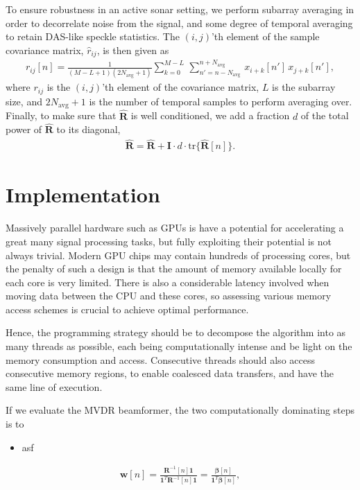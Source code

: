\documentclass[10pt,a4paper]{article}
\newcommand\tr{\text{tr}}
\newcommand\sumb[2]{\sum\limits_{#1}^{#2}\,}
\newcommand\T{^{\scriptscriptstyle T}}
\renewcommand\vec[1]{\boldsymbol{#1}}
\newcommand\mat[1]{\boldsymbol{#1}}
\newcommand\1{\vec 1}
\newcommand\I{\mat I}
\newcommand*\R{\mat R}
\newcommand*\Ri{\R^{-1}}
\newcommand*\eR{\mat{\hat R}}
\begin{document}
To ensure robustness in an active sonar setting, we perform subarray averaging in order to decorrelate noise from the signal, and some degree of temporal averaging to retain \gls{DAS}-like speckle statistics. The $(i,j)$'th element of the sample covariance matrix, $\hat r_{ij}$, is then given as
\begin{gather}
r_{ij}[n] = \frac{1}{(M-L+1)(2N_{\text{avg}}+1)}\sumb{k=0}{M-L} \sumb{n'=n-N_{\text{avg}}}{n+N_{\text{avg}}} x_{i+k}[n']\,x_{j+k}[n'],
\end{gather}
where $r_{ij}$ is the $(i,j)$'th element of the covariance matrix, $L$ is the subarray size, and $2N_{\text{avg}}+1$ is the number of temporal samples to perform averaging over. Finally, to make sure that $\eR$ is well conditioned, we add a fraction $d$ of the total power of $\eR$ to its diagonal\cite{Synnevag2007},
\begin{align}
\eR = \eR + \I \cdot d \cdot \tr\{\eR[n]\}.
\end{align}


\section{Implementation}

Massively parallel hardware such as \glspl{GPU} is  have a potential for accelerating a great many signal processing tasks, but fully exploiting their potential is not always trivial. Modern \gls{GPU} chips may contain hundreds of processing cores, but the penalty of such a design is that the amount of memory available locally for each core is very limited. There is also a considerable latency involved when moving data between the \gls{CPU} and these cores, so assessing various memory access schemes is crucial to achieve optimal performance.

Hence, the programming strategy should be to decompose the algorithm into as many threads as possible, each being computationally intense and be light on the memory consumption and access. Consecutive threads should also access consecutive memory regions, to enable coalesced data transfers, and have the same line of execution.

If we evaluate the \gls{MVDR} beamformer, the two computationally dominating steps is to

\begin{itemize}
 \item asf
\end{itemize}


\begin{gather}
\vec w[n] = \frac{\Ri[n]\1}{\1\T\Ri[n]\1} = \frac{\vec\beta[n]}{\1\T\vec\beta[n]},
\end{gather}
\end{document}

